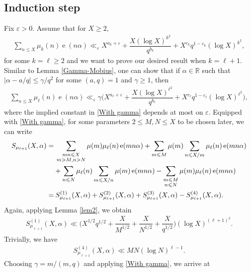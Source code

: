 \documentclass[11pt]{amsart}
\numberwithin{equation}{section}
\numberwithin{figure}{section}
\theoremstyle{definition}
\newcommand{\e}{\operatorname{e}}
\begin{document}
\subsection{Induction step} Fix $\varepsilon>0$. Assume that for $X \geqslant 2$,
\begin{align*}
   \sum_{n\leqslant X }\mu_k(n)\e(n\alpha) \ll_{\varepsilon} X^{a_k+\varepsilon}+ \dfrac{X(\log X)^{k^2}}{q^{b_k}} + X^{c_k}q^{1-c_k}(\log X)^{k^2}, 
\end{align*}
for some $k=\ell \geqslant 2$ and we want to prove our desired result when $k=\ell+1$. Similar to Lemma \ref{Gamma-Mobius}, one can show that if $\alpha\in \mathbb{R}$ such that $|\alpha-a/q|\leqslant \gamma/q^2$ for some $(a, q)=1$ and $\gamma \geqslant 1$, then
\begin{align}\label{With gamma}
   \sum_{n\leqslant X }\mu_\ell(n)\e(n\alpha) \ll_{\varepsilon} \gamma \bigg(X^{a_{\ell}+\varepsilon}+ \dfrac{X(\log X)^{\ell^2}}{q^{b_{\ell}}} + X^{c_{\ell}}q^{1-c_{\ell}}(\log X)^{\ell^2} \bigg), 
\end{align}
where the implied constant in \eqref{With gamma} depends at most on $\varepsilon$. Equipped with \eqref{With gamma}, for some parameters $2\leqslant M, N\leqslant X$ to be chosen later, we can write
\begin{align} 
S_{\mu_{\ell+1}}(X, \alpha)=&\: \sum_{\substack{mn\leqslant X \\ m> M, n>N}}\mu(m)\mu_\ell (n)\e(mn\alpha) + \sum_{m\leqslant M}\mu(m)\sum_{n\leqslant X/m}\mu_\ell (n)\e(mn\alpha)\notag \\
\notag &+\sum_{n\leqslant N}\mu_\ell (n)\sum_{m\leqslant X/n}\mu(m)\e(mn\alpha)-\sum_{\substack{m\leqslant M\\ n\leqslant N}}\mu(m)\mu _\ell (n)\e(mn\alpha)\\
=&\:  S_{\mu _{\ell+1} }^{(1)}(X, \alpha)+S_{\mu _{\ell+1} }^{(2)}(X, \alpha) + S_{\mu _{\ell+1} }^{(3)}(X, \alpha)-S_{\mu _{\ell+1} }^{(4)}(X, \alpha) \label{Dividing Sums I}.
\end{align}
Again, applying Lemma \ref{lem2}, we obtain
\begin{align} 
S_{\mu _{\ell+1} }^{(1)}(X, \alpha) \ll \bigg(X^{1/2}q^{1/2}+\dfrac{X}{M^{1/2}} + \dfrac{X}{N^{1/2}} + \dfrac{X}{q^{1/2}}\bigg)(\log X)^{(\ell+1)^2} \label{Bound 1}.
\end{align}
Trivially, we have
\begin{align}
S_{\mu _{\ell+1}}^{(4)}(X, \alpha) \ll  MN (\log N)^{\ell-1}. \label{Bound 4}
\end{align}
Choosing $\gamma = m/(m,q)$ and applying \eqref{With gamma}, we arrive at
\end{document}
